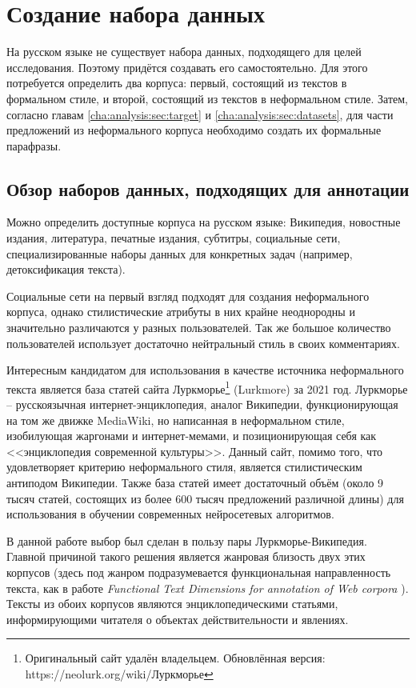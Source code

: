 \chapter{Создание набора данных} \label{cha:dataset}

На русском языке не существует набора данных, подходящего для целей исследования. 
Поэтому придётся создавать его самостоятельно.
Для этого потребуется определить два корпуса: первый, состоящий из текстов в формальном стиле, и второй, состоящий из текстов в неформальном стиле.
Затем, согласно главам \ref{cha:analysis:sec:target} и \ref{cha:analysis:sec:datasets}, для части предложений из неформального корпуса необходимо создать их формальные парафразы.

\section{Обзор наборов данных, подходящих для аннотации}
Можно определить доступные корпуса на русском языке: Википедия, новостные издания, литература, печатные издания, субтитры, социальные сети, специализированные наборы данных для конкретных задач (например, детоксификация текста).

Социальные сети на первый взгляд подходят для создания неформального корпуса, однако стилистические атрибуты в них крайне неоднородны и значительно различаются у разных пользователей. Так же большое количество пользователей использует достаточно нейтральный стиль в своих комментариях.

Интересным кандидатом для использования в качестве источника неформального текста является база статей сайта Луркморье\footnote{Оригинальный сайт удалён владельцем. Обновлённая версия: https://neolurk.org/wiki/Луркморье} (Lurkmore) за 2021 год.
Луркморье -- русскоязычная интернет-энциклопедия, аналог Википедии, функционирующая на том же движке MediaWiki, но написанная в неформальном стиле, изобилующая жаргонами и интернет-мемами, и позиционирующая себя как <<энциклопедия современной культуры>>.
Данный сайт, помимо того, что удовлетворяет критерию неформального стиля, является стилистическим антиподом Википедии.
Также база статей имеет достаточный объём (около 9 тысяч статей, состоящих из более 600 тысяч предложений различной длины) для использования в обучении современных нейросетевых алгоритмов.

В данной работе выбор был сделан в пользу пары Луркморье-Википедия. Главной причиной такого решения является жанровая близость двух этих корпусов (здесь под жанром подразумевается функциональная направленность текста, как в работе \textit{Functional Text Dimensions for annotation of Web corpora} \cite{sharov_corpora}). Тексты из обоих корпусов являются энциклопедическими статьями, информирующими читателя о объектах действительности и явлениях. 

